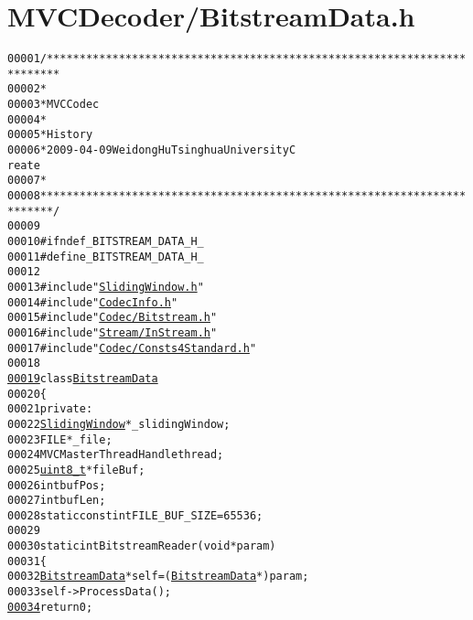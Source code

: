 \hypertarget{_bitstream_data_8h_source}{
\section{MVCDecoder/BitstreamData.h}
}


\begin{footnotesize}\begin{alltt}
00001 \textcolor{comment}{/************************************************************************}
00002 \textcolor{comment}{ *}
00003 \textcolor{comment}{ * MVC Codec}
00004 \textcolor{comment}{ * }
00005 \textcolor{comment}{ * History}
00006 \textcolor{comment}{ * 2009-04-09           Weidong Hu              Tsinghua University             C
      reate}
00007 \textcolor{comment}{ * }
00008 \textcolor{comment}{ ************************************************************************/}
00009 
00010 \textcolor{preprocessor}{#ifndef \_BITSTREAM\_DATA\_H\_}
00011 \textcolor{preprocessor}{}\textcolor{preprocessor}{#define \_BITSTREAM\_DATA\_H\_}
00012 \textcolor{preprocessor}{}
00013 \textcolor{preprocessor}{#include "\hyperlink{_sliding_window_8h}{SlidingWindow.h}"}
00014 \textcolor{preprocessor}{#include "\hyperlink{_codec_info_8h}{CodecInfo.h}"}
00015 \textcolor{preprocessor}{#include "\hyperlink{_bitstream_8h}{Codec/Bitstream.h}"}
00016 \textcolor{preprocessor}{#include "\hyperlink{_in_stream_8h}{Stream/InStream.h}"}
00017 \textcolor{preprocessor}{#include "\hyperlink{_consts4_standard_8h}{Codec/Consts4Standard.h}"}
00018 
\hypertarget{_bitstream_data_8h_source_l00019}{}\hyperlink{class_bitstream_data}{00019} \textcolor{keyword}{class }\hyperlink{class_bitstream_data}{BitstreamData}
00020 \{
00021 \textcolor{keyword}{private}:
00022         \hyperlink{class_sliding_window}{SlidingWindow} *\_slidingWindow;
00023         FILE *\_file;
00024         MVCMasterThreadHandle thread;
00025         \hyperlink{_types_8h_a363e4d606232036a6b89060813c45489}{uint8_t} *fileBuf;
00026         \textcolor{keywordtype}{int} bufPos;
00027         \textcolor{keywordtype}{int} bufLen;
00028         \textcolor{keyword}{static} \textcolor{keyword}{const} \textcolor{keywordtype}{int} FILE\_BUF\_SIZE = 65536;
00029 
00030         \textcolor{keyword}{static} \textcolor{keywordtype}{int} BitstreamReader(\textcolor{keywordtype}{void} *param)
00031         \{
00032                 \hyperlink{class_bitstream_data}{BitstreamData} *\textcolor{keyword}{self} = (\hyperlink{class_bitstream_data}{BitstreamData} *)param;
00033                 \textcolor{keyword}{self}->ProcessData();
\hypertarget{_bitstream_data_8h_source_l00034}{}\hyperlink{class_bitstream_data_a0a84eec74369ca5b7754250b683aaaaa}{00034}                 \textcolor{keywordflow}{return} 0;

\end{alltt}
\end{footnotesize}
